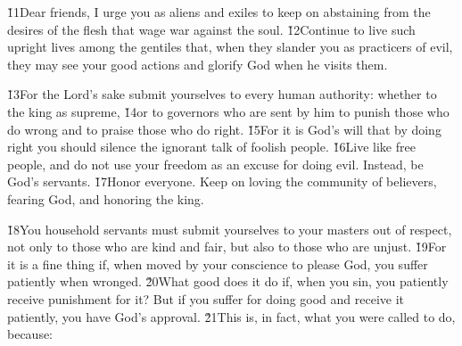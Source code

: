 \v{11}Dear friends, I urge you as aliens and exiles to keep on abstaining from the desires of the flesh that wage war against the soul. \v{12}Continue to live such upright lives among the gentiles that, when they slander you as practicers of evil, they may see your good actions and glorify God when he visits them.

\v{13}For the Lord's sake submit yourselves to every human authority: whether to the king as supreme, \v{14}or to governors who are sent by him to punish those who do wrong and to praise those who do right. \v{15}For it is God's will that by doing right you should silence the ignorant talk of foolish people. \v{16}Live like free people, and do not use your freedom as an excuse for doing evil. Instead, be God's servants. \v{17}Honor everyone. Keep on loving the community of believers, fearing God, and honoring the king.

\v{18}You household servants must submit yourselves to your masters out of respect, not only to those who are kind and fair, but also to those who are unjust. \v{19}For it is a fine thing if, when moved by your conscience to please God, you suffer patiently when wronged. \v{20}What good does it do if, when you sin, you patiently receive punishment for it? But if you suffer for doing good and receive it patiently, you have God's approval. \v{21}This is, in fact, what you were called to do, because:

